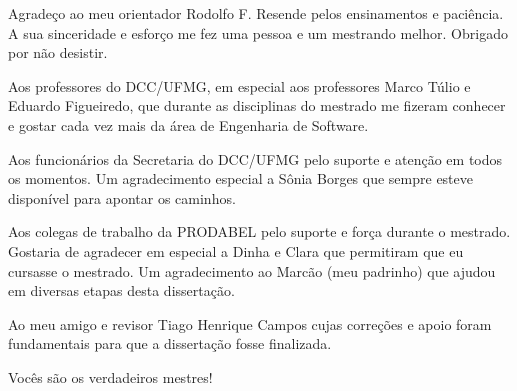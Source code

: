 Agradeço ao meu orientador Rodolfo F. Resende pelos ensinamentos e paciência. A
sua sinceridade e esforço me fez uma pessoa e um mestrando melhor. Obrigado
por não desistir.

Aos professores do DCC/UFMG, em especial aos professores Marco Túlio e Eduardo
Figueiredo, que durante as disciplinas do mestrado me fizeram conhecer e gostar
cada vez mais da área de Engenharia de Software.

Aos funcionários da Secretaria do DCC/UFMG pelo suporte e atenção em todos os
momentos. Um agradecimento especial a Sônia Borges que sempre esteve disponível
para apontar os caminhos.

Aos colegas de trabalho da PRODABEL pelo suporte e força durante o mestrado.
Gostaria de agradecer em especial a Dinha e Clara que permitiram que eu cursasse
o mestrado. Um agradecimento ao Marcão (meu padrinho) que ajudou em diversas
etapas desta dissertação.

Ao meu amigo e revisor Tiago Henrique Campos cujas correções e apoio foram
fundamentais para que a dissertação fosse finalizada.

Vocês são os verdadeiros mestres!
